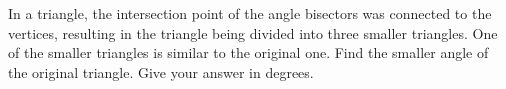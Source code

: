 In a triangle, the intersection point of the angle bisectors was connected to the vertices, resulting in the triangle being divided into three smaller triangles. One of the smaller triangles is similar to the original one. Find the smaller angle of the original triangle. Give your answer in degrees.
